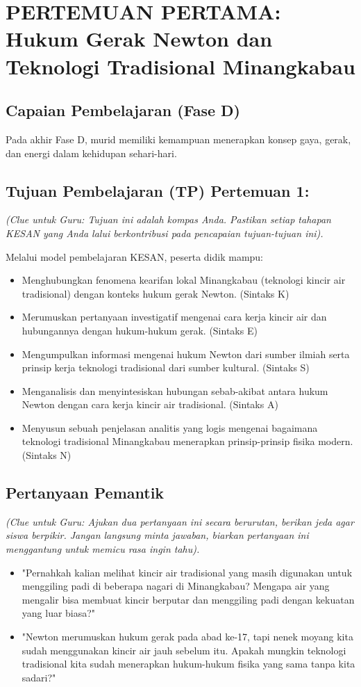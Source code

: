 \documentclass[a4paper,12pt]{article}
\begin{document}
\section{PERTEMUAN PERTAMA: Hukum Gerak Newton dan Teknologi Tradisional Minangkabau}

\subsection{Capaian Pembelajaran (Fase D)}
Pada akhir Fase D, murid memiliki kemampuan menerapkan konsep gaya, gerak, dan energi dalam kehidupan sehari-hari.

\subsection{Tujuan Pembelajaran (TP) Pertemuan 1:}
\textit{(Clue untuk Guru: Tujuan ini adalah kompas Anda. Pastikan setiap tahapan KESAN yang Anda lalui berkontribusi pada pencapaian tujuan-tujuan ini).}

Melalui model pembelajaran KESAN, peserta didik mampu:
\begin{itemize}
\item Menghubungkan fenomena kearifan lokal Minangkabau (teknologi kincir air tradisional) dengan konteks hukum gerak Newton. (Sintaks K)
\item Merumuskan pertanyaan investigatif mengenai cara kerja kincir air dan hubungannya dengan hukum-hukum gerak. (Sintaks E)
\item Mengumpulkan informasi mengenai hukum Newton dari sumber ilmiah serta prinsip kerja teknologi tradisional dari sumber kultural. (Sintaks S)
\item Menganalisis dan menyintesiskan hubungan sebab-akibat antara hukum Newton dengan cara kerja kincir air tradisional. (Sintaks A)
\item Menyusun sebuah penjelasan analitis yang logis mengenai bagaimana teknologi tradisional Minangkabau menerapkan prinsip-prinsip fisika modern. (Sintaks N)
\end{itemize}

\subsection{Pertanyaan Pemantik}
\textit{(Clue untuk Guru: Ajukan dua pertanyaan ini secara berurutan, berikan jeda agar siswa berpikir. Jangan langsung minta jawaban, biarkan pertanyaan ini menggantung untuk memicu rasa ingin tahu).}

\begin{itemize}
\item "Pernahkah kalian melihat kincir air tradisional yang masih digunakan untuk menggiling padi di beberapa nagari di Minangkabau? Mengapa air yang mengalir bisa membuat kincir berputar dan menggiling padi dengan kekuatan yang luar biasa?"
\item "Newton merumuskan hukum gerak pada abad ke-17, tapi nenek moyang kita sudah menggunakan kincir air jauh sebelum itu. Apakah mungkin teknologi tradisional kita sudah menerapkan hukum-hukum fisika yang sama tanpa kita sadari?"
\end{itemize}
\end{document}

